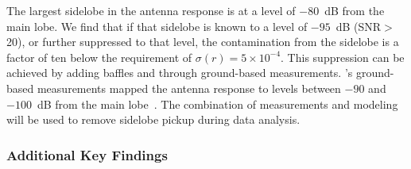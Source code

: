 \documentclass[PICOReport.tex]{subfiles}
\begin{document}

The largest sidelobe in the antenna response is at a level of $-80$~dB from the main lobe. We find that if that sidelobe is known to a level of $-95$~dB (\ac{SNR}$>$20), or further suppressed to that level, the contamination from the sidelobe is a factor of ten below the requirement of $\sigma(r) = 5 \times 10^{-4}$. This suppression can be achieved by adding baffles and through ground-based measurements. \planck 's ground-based measurements mapped the antenna response to levels between $-90$ and $-100$~dB from the main lobe~\citep{planck_sidelobes_IEEE}. The combination of measurements and modeling will be used to remove sidelobe pickup during data analysis. 
 


\subsubsection{Additional Key Findings}
\label{sec:systematics_key}
\end{document}
